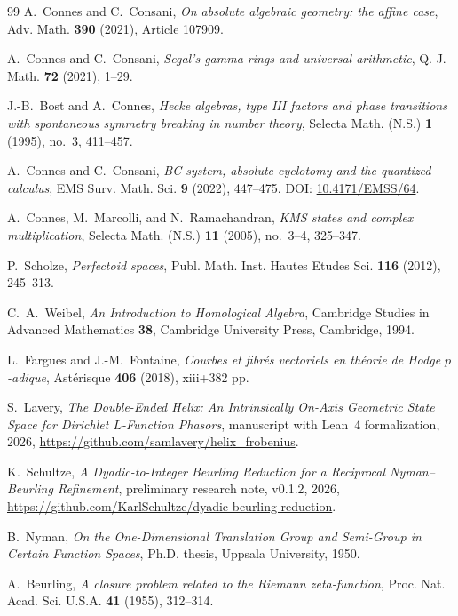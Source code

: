 \documentclass[11pt]{amsart}
\numberwithin{equation}{section}
\theoremstyle{definition}
\begin{document}
\begin{thebibliography}{99}
A.~Connes and C.~Consani,
\emph{On absolute algebraic geometry: the affine case},
Adv. Math. \textbf{390} (2021), Article 107909.

A.~Connes and C.~Consani,
\emph{Segal's gamma rings and universal arithmetic},
Q. J. Math. \textbf{72} (2021), 1--29.


J.-B.~Bost and A.~Connes,
\emph{Hecke algebras, type III factors and phase transitions with
spontaneous symmetry breaking in number theory},
Selecta Math. (N.S.) \textbf{1} (1995), no.~3, 411--457.

A.~Connes and C.~Consani,
\emph{BC-system, absolute cyclotomy and the quantized calculus},
EMS Surv. Math. Sci. \textbf{9} (2022), 447--475.
DOI: \href{https://doi.org/10.4171/EMSS/64}{10.4171/EMSS/64}.

A.~Connes, M.~Marcolli, and N.~Ramachandran,
\emph{KMS states and complex multiplication},
Selecta Math. (N.S.) \textbf{11} (2005), no.~3--4, 325--347.

P.~Scholze,
\emph{Perfectoid spaces},
Publ. Math. Inst. Hautes Etudes Sci. \textbf{116} (2012), 245--313.

C.~A.~Weibel,
\emph{An Introduction to Homological Algebra},
Cambridge Studies in Advanced Mathematics \textbf{38},
Cambridge University Press, Cambridge, 1994.

L.~Fargues and J.-M.~Fontaine,
\emph{Courbes et fibr\'es vectoriels en th\'eorie de Hodge $p$-adique},
Ast\'erisque \textbf{406} (2018), xiii+382 pp.

S.~Lavery,
\emph{The Double-Ended Helix: An Intrinsically On-Axis Geometric State
Space for Dirichlet $L$-Function Phasors},
manuscript with Lean~4 formalization, 2026,
\url{https://github.com/samlavery/helix_frobenius}.

K.~Schultze,
\emph{A Dyadic-to-Integer Beurling Reduction for a Reciprocal
Nyman--Beurling Refinement},
preliminary research note, v0.1.2, 2026,
\url{https://github.com/KarlSchultze/dyadic-beurling-reduction}.

B.~Nyman,
\emph{On the One-Dimensional Translation Group and Semi-Group in Certain
Function Spaces},
Ph.D. thesis, Uppsala University, 1950.

A.~Beurling,
\emph{A closure problem related to the Riemann zeta-function},
Proc. Nat. Acad. Sci. U.S.A. \textbf{41} (1955), 312--314.


\end{thebibliography}
\end{document}
